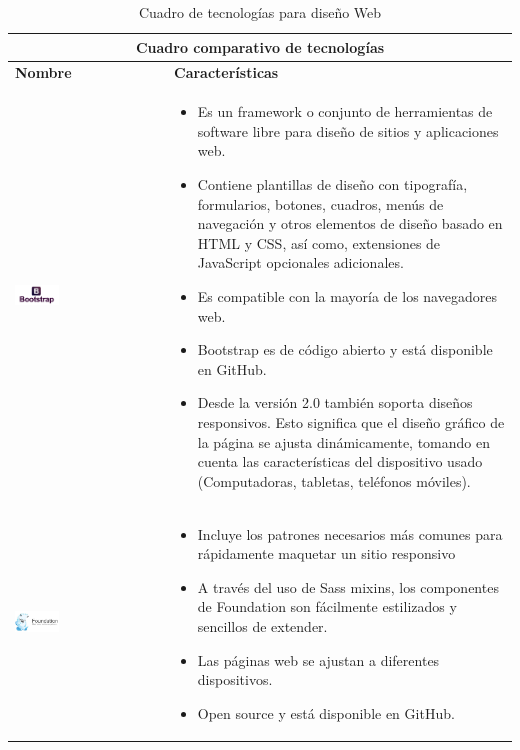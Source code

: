 \newpage
\begin{table}[b!]
	\centering
	\begin{tabular}{|p{1cm}|l}
		\hline
		\multicolumn{2}{|c|}{{\bf Cuadro comparativo de tecnologías}} \\ 
		\hline
		\multicolumn{1}{|p{4cm}|}{{\bf Nombre}}                                             &   
		\multicolumn{1}{p{10cm}|}{{\bf Características}}\\
		\hline
		\multicolumn{1}{|p{5cm}|}{\includegraphics[width=0.3\textwidth]{images/bootstrap}}  &   
		\multicolumn{1}{p{10cm}|}{\begin{itemize} 
		\vspace{-20mm}
		\item Es un framework o conjunto de herramientas de software libre para diseño de sitios y aplicaciones web. 
		\item Contiene plantillas de diseño con tipografía, formularios, botones, cuadros, menús de navegación y otros elementos de diseño basado en HTML y CSS, así como, extensiones de JavaScript opcionales adicionales.
		\item Es compatible con la mayoría de los navegadores web.
		\item Bootstrap es de código abierto y está disponible en GitHub. 
		\item Desde la versión 2.0 también soporta diseños responsivos. Esto significa que el diseño gráfico de la página se ajusta dinámicamente, tomando en cuenta las características del dispositivo usado (Computadoras, tabletas, teléfonos móviles).
		\cite{34}
		\end{itemize}} \\
		\hline
		\multicolumn{1}{|p{5cm}|}{\includegraphics[width=0.3\textwidth]{images/foundation}} &   
		\multicolumn{1}{p{10cm}|}{ 
		\begin{itemize}
		\vspace{-20mm}
		\setlist[itemize]{noitemsep, topsep=0pt}  
		\item Incluye los patrones necesarios más comunes para rápidamente maquetar un sitio responsivo
		\item A través del uso de Sass mixins, los componentes de Foundation son fácilmente estilizados y sencillos de extender.
		\item Las páginas web se ajustan a diferentes dispositivos.
		\item Open source y está disponible en GitHub.
		\cite{35}
		\end{itemize}}\\ 
		\hline
	\end{tabular}
	\caption{Cuadro de tecnologías para diseño Web}
	\label{table:Cuadro comparativo de tecnologias web}
\end{table}

